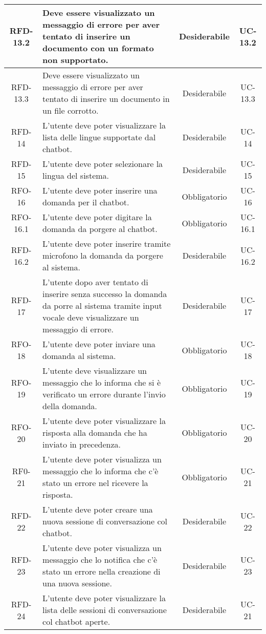 \begin{xltabular}{\textwidth}{| c | X | c | c |}
    \hline
    RFD-13.2 & Deve essere visualizzato un messaggio di errore per aver tentato di inserire un documento con un formato non supportato. & Desiderabile & UC-13.2 \\
    \hline
    RFD-13.3 & Deve essere visualizzato un messaggio di errore per aver tentato di inserire un documento in un file corrotto. & Desiderabile & UC-13.3 \\
    \hline
    RFD-14 & L’utente deve poter visualizzare la lista delle lingue supportate dal chatbot. & Desiderabile & UC-14 \\
    \hline
    RFD-15 & L’utente deve poter selezionare la lingua del sistema. & Desiderabile & UC-15 \\
    \hline
    RFO-16 & L’utente deve poter inserire una domanda per il chatbot. & Obbligatorio & UC-16 \\
    \hline
    RFO-16.1 & L’utente deve poter digitare la domanda da porgere al chatbot. & Obbligatorio & UC-16.1 \\
    \hline
    RFD-16.2 & L’utente deve poter inserire tramite microfono la domanda da porgere al sistema. & Desiderabile & UC-16.2 \\
    \hline
    RFD-17 & L’utente dopo aver tentato di inserire senza successo la domanda da porre al sistema tramite input vocale deve visualizzare un messaggio di errore. & Desiderabile & UC-17 \\
    \hline
    RFO-18 & L’utente deve poter inviare una domanda al sistema. & Obbligatorio & UC-18 \\
    \hline
    RFO-19 & L’utente deve visualizzare un messaggio che lo informa che si è verificato un errore durante l'invio della domanda. & Obbligatorio & UC-19 \\
    \hline
    RFO-20 & L’utente deve poter visualizzare la risposta alla domanda che ha inviato in precedenza. & Obbligatorio & UC-20 \\
    \hline
    RF0-21 & L'utente deve poter visualizza un messaggio che lo informa che c'è stato un errore nel ricevere la risposta. & Obbligatorio & UC-21 \\
    \hline
    RFD-22 & L’utente deve poter creare una nuova sessione di conversazione col chatbot. & Desiderabile & UC-22 \\
    \hline
    RFD-23 & L'utente deve poter visualizza un messaggio che lo notifica che c'è stato un errore nella creazione di una nuova sessione. & Desiderabile & UC-23 \\
    \hline
    RFD-24 & L’utente deve poter visualizzare la lista delle sessioni di conversazione col chatbot aperte. & Desiderabile & UC-21 \\

\end{xltabular}
